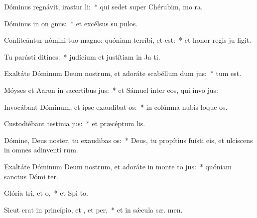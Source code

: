 \item Dóminus regnávit, irastur li:~* qui sedet super Chérubim, mo ra.
\item Dóminus in on gnus:~* et excélsus su  pulos.
\item Confiteántur nómini tuo magno: quóniam terríbi, et  est:~* et honor regis ju ligit.
\item Tu parásti ditines:~* judícium et justítiam in Ja  ti.
\item Exaltáte Dóminum Deum nostrum, et adoráte scabéllum dum jus:~*  tum est.
\item Móyses et Aaron in sacertibus jus:~* et Sámuel inter eos, qui ínvo  jus:
\item Invocábant Dóminum, et ipse exaudibat os:~* in colúmna nubis loque  os.
\item Custodiébant testinia jus:~* et præcéptum   lis.
\item Dómine, Deus noster, tu exaudibas os:~* Deus, tu propítius fuísti eis, et ulcíscens in omnes adinventi rum.
\item Exaltáte Dóminum Deum nostrum, et adoráte in monte to jus:~* quóniam sanctus Dómi  ter.
\item Glória tri, et o,~* et Spi to.
\item Sicut erat in princípio, et , et per,~* et in sǽcula sæ. men.
